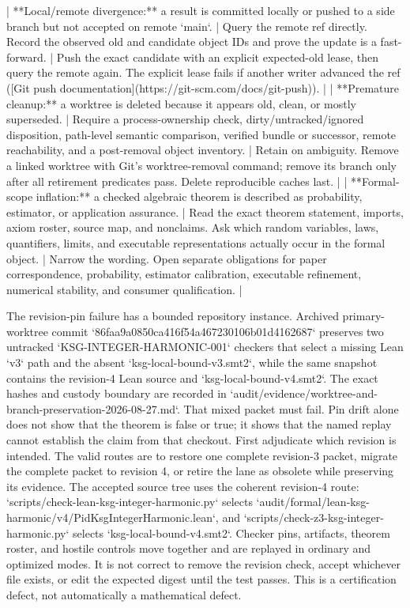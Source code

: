 \documentclass[11pt]{article}
\begin{document}
\begin{markdown}
| **Local/remote divergence:** a result is committed locally or pushed to a side branch but not accepted on remote `main`. | Query the remote ref directly. Record the observed old and candidate object IDs and prove the update is a fast-forward. | Push the exact candidate with an explicit expected-old lease, then query the remote again. The explicit lease fails if another writer advanced the ref ([Git push documentation](https://git-scm.com/docs/git-push)). |
| **Premature cleanup:** a worktree is deleted because it appears old, clean, or mostly superseded. | Require a process-ownership check, dirty/untracked/ignored disposition, path-level semantic comparison, verified bundle or successor, remote reachability, and a post-removal object inventory. | Retain on ambiguity. Remove a linked worktree with Git's worktree-removal command; remove its branch only after all retirement predicates pass. Delete reproducible caches last. |
| **Formal-scope inflation:** a checked algebraic theorem is described as probability, estimator, or application assurance. | Read the exact theorem statement, imports, axiom roster, source map, and nonclaims. Ask which random variables, laws, quantifiers, limits, and executable representations actually occur in the formal object. | Narrow the wording. Open separate obligations for paper correspondence, probability, estimator calibration, executable refinement, numerical stability, and consumer qualification. |

The revision-pin failure has a bounded repository instance. Archived primary-worktree commit
`86faa9a0850ca416f54a467230106b01d4162687` preserves two untracked
`KSG-INTEGER-HARMONIC-001` checkers that select a missing Lean `v3` path and the absent
`ksg-local-bound-v3.smt2`, while the same snapshot contains the revision-4 Lean source and
`ksg-local-bound-v4.smt2`. The exact hashes and custody boundary are recorded in
`audit/evidence/worktree-and-branch-preservation-2026-08-27.md`. That mixed packet must fail. Pin
drift alone does not show that the theorem is false or true; it shows that the named replay cannot
establish the claim from that checkout. First adjudicate which revision is intended. The valid
routes are to restore one complete revision-3 packet, migrate the complete packet to revision 4, or
retire the lane as obsolete while preserving its evidence. The accepted source tree uses the
coherent revision-4 route: `scripts/check-lean-ksg-integer-harmonic.py` selects
`audit/formal/lean-ksg-harmonic/v4/PidKsgIntegerHarmonic.lean`, and
`scripts/check-z3-ksg-integer-harmonic.py` selects `ksg-local-bound-v4.smt2`. Checker pins,
artifacts, theorem roster, and hostile controls move together and are replayed in ordinary and
optimized modes. It is not correct to remove the revision check, accept whichever file exists, or
edit the expected digest until the test passes. This is a certification defect, not automatically
a mathematical defect.


\end{markdown}
\end{document}
